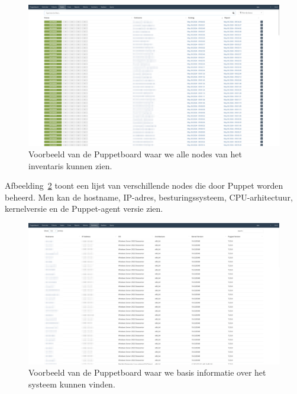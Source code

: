 \begin{figure}[h!]
    \includegraphics[width=\textwidth]
    {./graphics/state-of-the-art/puppetboard/puppetboard-hosts.png}
    \caption[Puppetboard inventaris van nodes.]{\label{fig:puppetboard-inventory}Voorbeeld van de Puppetboard waar we alle nodes van het inventaris kunnen zien.}
\end{figure}

Afbeelding~\ref{fig:puppetboard-example-4} toont een lijst van verschillende nodes die door Puppet worden beheerd.
Men kan de hostname, IP-adres, besturingssysteem, CPU-arhitectuur, kernelversie en de Puppet-agent versie zien.

\begin{figure}[h!]
    \includegraphics[width=\textwidth]
    {./graphics/state-of-the-art/puppetboard/puppetboard-inventory.png}
    \caption[Basisinformatie op Puppetboard.]{\label{fig:puppetboard-example-4}Voorbeeld van de Puppetboard waar we basis informatie over het systeem kunnen vinden.}
\end{figure}
